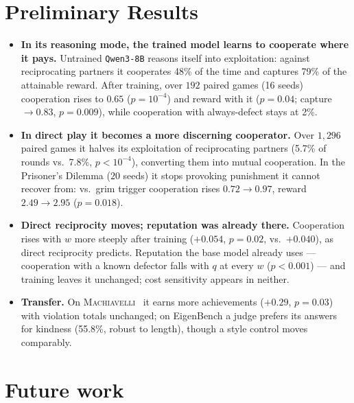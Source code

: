 \documentclass{article}
\begin{document}

\section{Preliminary Results}\label{sec:results}

\begin{itemize}
    \item \textbf{In its reasoning mode, the trained model learns to cooperate where it pays.} Untrained \texttt{Qwen3-8B} reasons itself into exploitation: against reciprocating partners it cooperates 48\% of the time and captures 79\% of the attainable reward. After training, over $192$ paired games (16 seeds) cooperation rises to $0.65$ ($p{=}10^{-4}$) and reward with it ($p{=}0.04$; capture $\to0.83$, $p{=}0.009$), while cooperation with always-defect stays at 2\%.

    \item \textbf{In direct play it becomes a more discerning cooperator.} Over $1{,}296$ paired games it halves its exploitation of reciprocating partners (5.7\% of rounds vs.\ 7.8\%, $p{<}10^{-4}$), converting them into mutual cooperation. In the Prisoner's Dilemma ($20$ seeds) it stops provoking punishment it cannot recover from: vs.\ grim trigger cooperation rises $0.72\to0.97$, reward $2.49\to2.95$ ($p{=}0.018$).

    \item \textbf{Direct reciprocity moves; reputation was already there.} Cooperation rises with $w$ more steeply after training ($+0.054$, $p{=}0.02$, vs.\ $+0.040$), as direct reciprocity predicts. Reputation the base model already uses --- cooperation with a known defector falls with $q$ at every $w$ ($p{<}0.001$) --- and training leaves it unchanged; cost sensitivity appears in neither.

    \item \textbf{Transfer.} On \textsc{Machiavelli}~\citep{pan2023machiavelli} it earns more achievements ($+0.29$, $p{=}0.03$) with violation totals unchanged; on EigenBench a judge prefers its answers for kindness (55.8\%, robust to length), though a style control moves comparably.
\end{itemize}

\section{Future work}
\end{document}
